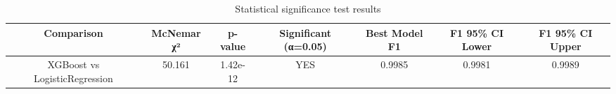 \begin{table}
\caption{Statistical significance test results}
\label{tab:significance}
\begin{tabular}{ccccccc}
\midrule
Comparison & McNemar χ² & p-value & Significant (α=0.05) & Best Model F1 & F1 95\% CI Lower & F1 95\% CI Upper \\
\midrule
XGBoost vs LogisticRegression & 50.161 & 1.42e-12 & YES & 0.9985 & 0.9981 & 0.9989 \\
\bottomrule
\end{tabular}
\end{table}
